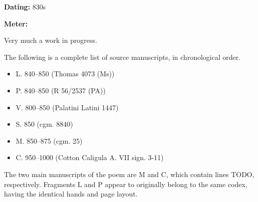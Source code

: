 
\begin{flushright}%
\textbf{Dating:} 830s

\textbf{Meter:} \Fornyrdislag%
\end{flushright}%

Very much a work in progress.

The following is a complete list of source manuscripts, in chronological order.

\begin{itemize}
  \item L. 840–850 (Thomas 4073 (Ms))
  \item P. 840–850 (R 56/2537 (PA))
  \item V. 800–850 (Palatini Latini 1447)
  \item S. 850 (cgm. 8840)
  \item M. 850–875 (cgm. 25)
  \item C. 950–1000 (Cotton Caligula A. VII sign. 3-11)
\end{itemize}

The two main manuscripts of the poem are M and C, which contain lines TODO, respectively.  Fragments L and P appear to originally belong to the same codex, having the identical hands and page layout.



